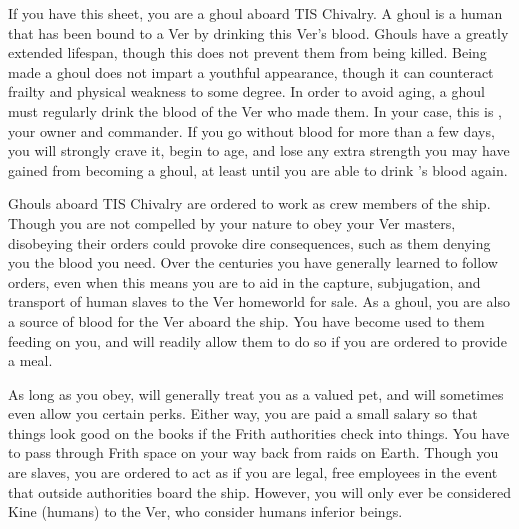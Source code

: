\documentclass[blue]{guildcamp4}
\begin{document}
\name{\bGhouls{}}

If you have this sheet, you are a ghoul aboard TIS Chivalry. A ghoul is a human that has been bound to a Ver by drinking this Ver's blood. Ghouls have a greatly extended lifespan, though this does not prevent them from being killed. Being made a ghoul does not impart a youthful appearance, though it can counteract frailty and physical weakness to some degree. In order to avoid aging, a ghoul must regularly drink the blood of the Ver who made them. In your case, this is \cVone{}, your owner and commander. If you go without \cVone{\their} blood for more than a few days, you will strongly crave it, begin to age, and lose any extra strength you may have gained from becoming a ghoul, at least until you are able to drink \cVone{}'s blood again.

Ghouls aboard TIS Chivalry are ordered to work as crew members of the ship. Though you are not compelled by your nature to obey your Ver masters, disobeying their orders could provoke dire consequences, such as them denying you the blood you need. Over the centuries you have generally learned to follow orders, even when this means you are to aid in the capture, subjugation, and transport of human slaves to the Ver homeworld for sale. As a ghoul, you are also a source of blood for the Ver aboard the ship. You have become used to them feeding on you, and will readily allow them to do so if you are ordered to provide a meal.

As long as you obey, \cVone{} will generally treat you as a valued pet, and will sometimes even allow you certain perks. Either way, you are paid a small salary so that things look good on the books if the Frith authorities check into things. You have to pass through Frith space on your way back from raids on Earth. Though you are slaves, you are ordered to act as if you are legal, free employees in the event that outside authorities board the ship. However, you will only ever be considered Kine (humans) to the Ver, who consider humans inferior beings. 
\end{document}
